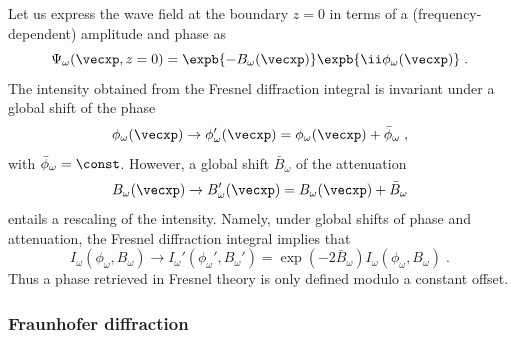 \documentclass[
twoside,
openright,
titlepage,
numbers=noenddot,
headinclude,
fleqn,
a4paper,
footinclude=true,
cleardoublepage=empty,
abstractoff,
BCOR=5mm,
paper=a4,
fontsize=11pt,
british,ngerman,american,
]{scrreprt}
\begin{document}
Let us express the wave field at the boundary $z=0$ in terms of a
(frequency-dependent) amplitude and phase as
\begin{equation}
  \label{eq:exit-wave}
  \Psi_{\omega}(\vecxp,z=0) = 
  \expb{-B_\omega(\vecxp)}\expb{\ii\phi_\omega(\vecxp)} \;.
\end{equation}
The intensity obtained from the Fresnel diffraction integral is
invariant under a global shift of the phase
\begin{equation}
  \label{eq:global-phase-shift}
  \phi_\omega(\vecxp) \to \phi_\omega'(\vecxp) =  
  \phi_\omega(\vecxp) +  \bar{\phi}_\omega \;,
\end{equation}
with $\bar{\phi}_\omega=\const$.  However, a global shift
$\bar{B}_\omega$ of the attenuation
\begin{equation}
  \label{eq:global-attenuation-shift}
  B_\omega(\vecxp) \to B_\omega'(\vecxp) = 
  B_\omega(\vecxp) + \bar{B}_\omega 
\end{equation}
entails a rescaling of the intensity.  Namely, under global shifts of
phase and attenuation, the Fresnel diffraction integral implies that
\begin{equation}
  \label{eq:intensity-rescaling}
  I_\omega(\phi_\omega,B_\omega) \to I_\omega'(\phi_\omega',B_\omega') = 
  \exp(-2\bar{B}_\omega)I_\omega(\phi_\omega,B_\omega) \;.
\end{equation}
Thus a phase retrieved in Fresnel theory is only defined modulo a
constant offset.


\subsubsection{Fraunhofer diffraction}
\label{sec:fraunhofer}
\end{document}
